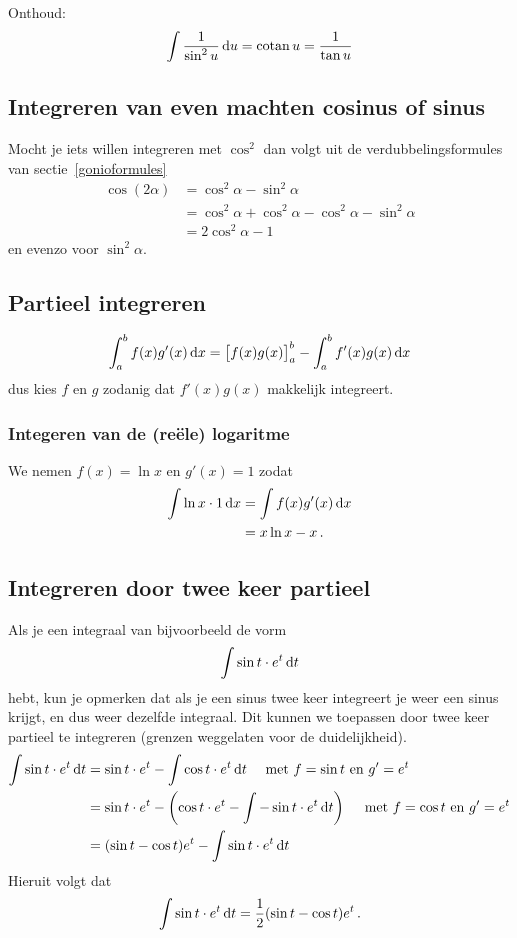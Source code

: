 Onthoud:
\begin{align*}
    \int \frac{1}{\sin^2 u} \mathop{}\!\mathrm{d} u = \operatorname{cotan} u = \frac{1}{\tan u}
\end{align*}

\subsection{Integreren van even machten cosinus of sinus}\label{subsec:integrerenVanEvenMachtenCosinusOfSinus}

Mocht je iets willen integreren met $\cos^2$ dan volgt uit de verdubbelingsformules van sectie~\ref{gonioformules}
\begin{align*}
    \cos (2\alpha) &= \cos^2 \alpha - \sin^2 \alpha \\
    &=  \cos^2 \alpha + \cos^2 \alpha - \cos^2 \alpha - \sin^2 \alpha \\
    &= 2\cos^2 \alpha -1
\end{align*}
en evenzo voor $\sin^2 \alpha$.

\subsection{Partieel integreren}\label{subsec:partieelIntegreren}

\[
    \int_a^b f(x) g'(x) \mathop{}\!\mathrm{d} x = \big[f(x)g(x)\big]_a^b - \int_a^b f'(x) g(x) \mathop{}\!\mathrm{d} x
\]
dus kies $f$ en $g$ zodanig dat $f'(x)g(x)$ makkelijk integreert.

\subsubsection{Integeren van de (re\"ele) logaritme}

We nemen $f(x)=\ln x$ en $g'(x)=1$ zodat
\begin{align*}
    \int \ln x \cdot 1 \mathop{}\!\mathrm{d} x &= \int f(x)g'(x) \mathop{}\!\mathrm{d} x \\
    &= x \ln x - x \,.
\end{align*}

\subsection{Integreren door twee keer partieel}\label{subsec:integrerenDoorTweeKeerPartieel}

Als je een integraal van bijvoorbeeld de vorm
\[
    \int \sin t \cdot e^t \mathop{}\!\mathrm{d} t
\]
hebt, kun je opmerken dat als je een sinus twee keer integreert je weer een sinus
krijgt, en dus weer dezelfde integraal.
Dit kunnen we toepassen
door twee keer partieel te integreren (grenzen weggelaten voor de duidelijkheid).
\begin{align*}
    \int \sin t \cdot e^t \mathop{}\!\mathrm{d} t &= \sin t \cdot e^t - \int \cos t \cdot e^t \mathop{}\!\mathrm{d} t
    \quad \text{ met $f=\sin t$ en $g'=e^t$} \\
    &= \sin t \cdot e^t - \left( \cos t \cdot e^t - \int - \sin t \cdot e^t \mathop{}\!\mathrm{d} t \right)
    \quad \text{ met $f=\cos t$ en $g'=e^t$} \\
    &= ( \sin t - \cos t ) e^t -  \int \sin t \cdot e^t \mathop{}\!\mathrm{d} t
\end{align*}
Hieruit volgt dat
\[  \int \sin t \cdot e^t \mathop{}\!\mathrm{d} t = \frac{1}{2} ( \sin t - \cos t ) e^t\,. \]

